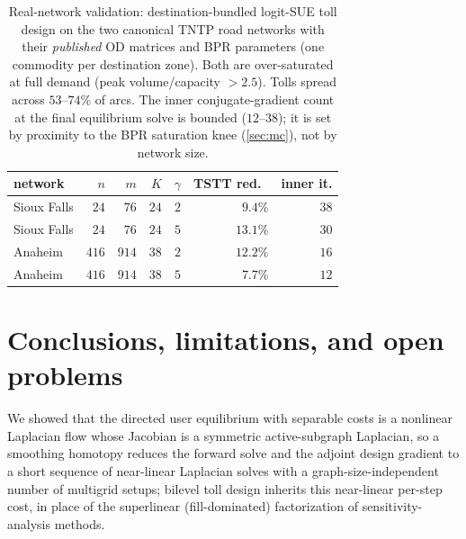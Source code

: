 \documentclass[ijoc]{informs3}
\begin{document}
\begin{table}[t]\centering
\caption{Real-network validation: destination-bundled logit-SUE toll design on the two canonical TNTP road
networks with their \emph{published} OD matrices and BPR parameters (one commodity per destination zone). Both
are over-saturated at full demand (peak volume/capacity $>2.5$). Tolls spread across $53$--$74\%$ of arcs. The
inner conjugate-gradient count at the final equilibrium solve is bounded ($12$--$38$); it is set by proximity
to the BPR saturation knee (\cref{sec:mc}), not by network size.}
\label{tab:mcreal}
\begin{tabular}{lrrrrrr}\toprule
network & $n$ & $m$ & $K$ & $\gamma$ & TSTT red.\ & inner it.\\\midrule
Sioux Falls & $24$  & $76$  & $24$ & $2$ & $9.4\%$  & $38$\\
Sioux Falls & $24$  & $76$  & $24$ & $5$ & $13.1\%$ & $30$\\
Anaheim     & $416$ & $914$ & $38$ & $2$ & $12.2\%$ & $16$\\
Anaheim     & $416$ & $914$ & $38$ & $5$ & $\phantom{0}7.7\%$  & $12$\\\bottomrule
\end{tabular}
\end{table}

\section{Conclusions, limitations, and open problems}\label{sec:conclusion}
We showed that the directed user equilibrium with separable costs is a nonlinear Laplacian flow whose Jacobian
is a symmetric active-subgraph Laplacian, so a smoothing homotopy reduces the forward solve and the adjoint
design gradient to a short sequence of near-linear Laplacian solves with a graph-size-independent number of
multigrid setups; bilevel toll design inherits this near-linear per-step cost, in place of the superlinear (fill-dominated)
factorization of sensitivity-analysis methods.
\end{document}
